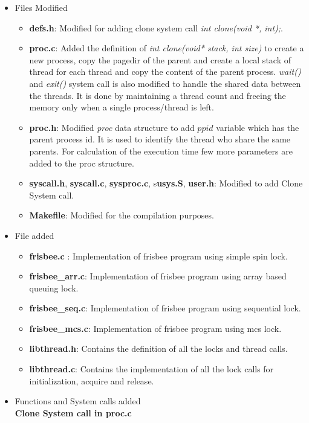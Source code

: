 \documentclass[a4paper, 11pt]{article}
\begin{document}
\begin{itemize}
\item Files Modified
\begin{itemize}
\item \textbf{defs.h}: Modified for adding clone system call  \emph{int clone(void *, int);}.
\item \textbf{proc.c}:  Added the definition of \emph{int clone(void* stack, int size)} to create a new process, copy the pagedir of the parent and create a local stack of thread for each thread and copy the content of the parent process. \emph{wait()} and \emph{exit()} system call is also modified to handle the shared data between the threads. It is done by maintaining a thread count and freeing the memory only when a single process/thread is left.
\item \textbf{proc.h}: Modified \emph{proc} data structure to add $ppid$ variable which has the parent process id. It is used to identify the thread who share the same parents. For calculation of the execution time few more parameters are added to the proc structure.
\item \textbf{syscall.h}, \textbf{syscall.c}, \textbf{sysproc.c}, s\textbf{usys.S}, \textbf{user.h}: Modified to add Clone System call.
\item \textbf{Makefile}: Modified for the compilation purposes.
\end{itemize}
\item File added 
\begin{itemize}
\item \textbf{frisbee.c} : Implementation of frisbee program using simple spin lock.
\item \textbf{frisbee\_arr.c}: Implementation of frisbee program using array based queuing lock.
\item \textbf{frisbee\_seq.c}: Implementation of frisbee program using sequential lock.
\item \textbf{frisbee\_mcs.c}: Implementation of frisbee program using mcs lock.
\item \textbf{libthread.h}: Contains the definition of all the locks and thread calls.
\item \textbf{libthread.c}: Contains the implementation of all the lock calls for initialization, acquire and release.
\end{itemize}

\item Functions and System calls added\\
\textbf{Clone System call in proc.c}



\end{itemize}
\end{document}
